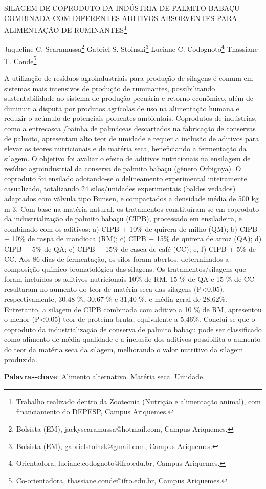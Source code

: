 \documentclass[article,12pt,onesidea,4paper,english,brazil]{abntex2}
\begin{document}
	
	
	\frenchspacing 
	
	\begin{center}
		\LARGE SILAGEM DE COPRODUTO DA INDÚSTRIA DE PALMITO BABAÇU COMBINADA COM DIFERENTES ADITIVOS ABSORVENTES
		PARA\\ALIMENTAÇÃO DE RUMINANTES\footnote{Trabalho realizado dentro da Zootecnia (Nutrição e alimentação animal), com financiamento do DEPESP, Campus Ariquemes.}
		
		\normalsize
		Jaqueline C. Scaramussa\footnote{Bolsista (EM), jackyscaramussa@hotmail.com, Campus Ariquemes.} 
		Gabriel S. Stoinski\footnote{Bolsista (EM), gabrielstoinsk@gmail.com, Campus Ariquemes.} 
		Luciane C. Codognoto\footnote{Orientadora, luciane.codognoto@ifro.edu.br, Campus Ariquemes.} 
		Thassiane T. Conde\footnote{Co-orientadora, thassiane.conde@ifro.edu.br, Campus Ariquemes.} 
	\end{center}
	
	\noindent A utilização de resíduos agroindustriais para produção de silagens é comum em sistemas mais intensivos de produção de ruminantes, possibilitando sustentabilidade ao sistema de produção pecuária e retorno econômico, além de diminuir a disputa por produtos agrícolas de uso na alimentação humana e reduzir o acúmulo de potenciais poluentes ambientais. Coprodutos de indústrias, como a entrecasca
	/bainha de palmáceas descartados na fabricação de conservas de palmito, apresentam alto teor de umidade e requer a inclusão de aditivos para elevar os teores nutricionais e de matéria seca, beneficiando a fermentação da silagem. O objetivo foi avaliar o efeito de aditivos nutricionais na ensilagem de resíduo agroindustrial da conserva de palmito babaçu (gênero Orbignya). O coproduto foi ensilado adotando-se o delineamento experimental inteiramente casualizado, totalizando 24 silos/unidades experimentais (baldes vedados) adaptados com válvula tipo Bunsen, e compactados a densidade média de 500 kg m-3. Com base na matéria natural, os tratamentos constituíram-se em coproduto da industrialização de palmito babaçu (CIPB), processado em ensiladeira, e combinado com os aditivos: a) CIPB + 10\% de quirera de milho (QM); b) CIPB + 10\% de raspa de mandioca (RM);
	c) CIPB + 15\% de quirera de arroz (QA); d) CIPB + 5\% de QA; e) CIPB + 15\% de casca de café (CC); e, f) CIPB + 5\% de CC. Aos 86 dias de fermentação, os silos foram abertos, determinados a composição químico-bromatológica das silagens. Os tratamentos/silagens que foram incluídos os aditivos nutricionais 10\% de RM, 15 \% de QA e 15 \% de CC resultaram no aumento do teor de matéria seca das silagens (P<0,05), respectivamente, 30,48 \%, 30,67 \% e 31,40 \%, e média geral de 28,62\%. Entretanto, a silagem de CIPB combinada com aditivo a 10 \% de RM, apresentou o menor (P<0,05) teor de proteína bruta, equivalente a 5,46\%. Conclui-se que o coproduto da industrialização de conserva de palmito babaçu pode ser classificado como alimento de média qualidade e a inclusão dos aditivos possibilita o aumento do teor da matéria seca da silagem, melhorando o valor nutritivo da silagem produzida.
	
	\vspace{\onelineskip}
	
	\noindent
	\textbf{Palavras-chave}: Alimento alternativo. Matéria seca. Umidade.
	
\end{document}

